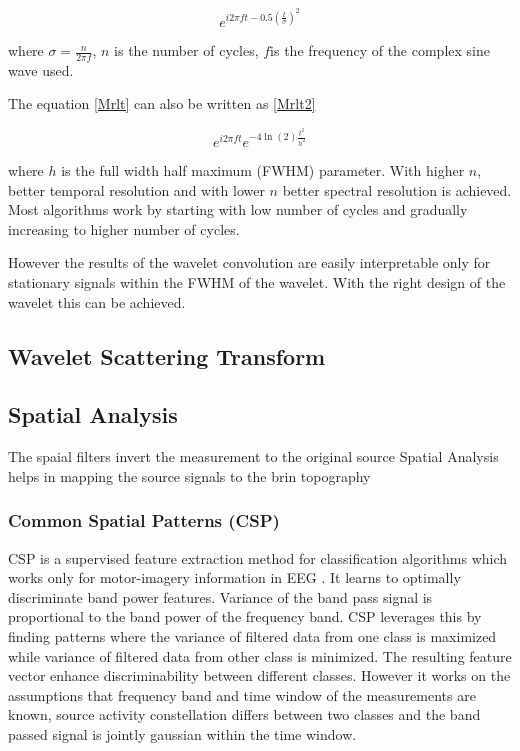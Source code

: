 \begin{equation} \label{eq:Mrlt1}
    e^{i2\pi ft -0.5(\frac{t}{\sigma})^2}
\end{equation}

where $\sigma = \frac{n}{2\pi f}$, $n$ is the number of cycles, $f $is the frequency of the complex sine wave used.

The equation \ref*{Mrlt} can also be written as  \ref*{Mrlt2}

\begin{equation} \label{eq:Mrlt2}
    e^{i2\pi ft} e^{-4\ln(2)\frac{t^2}{h^2}}
\end{equation}

where $h$ is the full width half maximum (FWHM) parameter. With higher $n$, better temporal resolution and with lower $n$ better spectral resolution is achieved. Most algorithms
work by starting with low number of cycles and gradually increasing to higher number of cycles.

However the results of the wavelet convolution are easily interpretable only for stationary signals within the FWHM of the wavelet. With the right design of
the wavelet this can be achieved.

\subsection{Wavelet Scattering Transform}

\subsection{Spatial Analysis}
The spaial filters invert the measurement to the original source
Spatial Analysis helps in mapping the source signals to the brin topography

\subsubsection{Common Spatial Patterns (CSP)}
CSP is a supervised feature extraction method for classification algorithms which works only for motor-imagery information in EEG . It learns to optimally
discriminate band power features. Variance of the band pass signal is proportional to the band power of the frequency band. CSP leverages this by finding patterns
where the  variance of filtered data from one class is maximized while variance of filtered data from other class is minimized. The resulting feature
vector enhance discriminability between different classes. However it works on the assumptions that frequency band and time window of the measurements are known, source
activity constellation differs between two classes and the band passed signal is jointly gaussian within the time window. 

